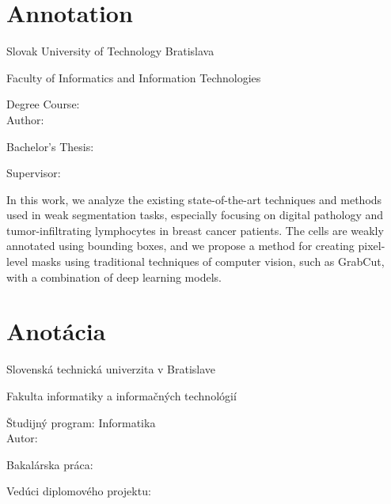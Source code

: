 
\thispagestyle{empty}

\section*{Annotation}

\begin{minipage}[t]{1\columnwidth}%
Slovak University of Technology Bratislava 

Faculty of Informatics and Information Technologies

Degree Course: \myStudyProgram\\

Author: \myName

Bachelor's Thesis: \myTitle

Supervisor: \mySupervisor

\myDate%
\end{minipage}

\bigskip{}

In this work, we analyze the existing state-of-the-art techniques and methods used in weak segmentation tasks, especially focusing on digital pathology and tumor-infiltrating lymphocytes in breast cancer patients. The cells are weakly annotated using bounding boxes, and we propose a method for creating pixel-level masks using traditional techniques of computer vision, such as GrabCut, with a combination of deep learning models.



\newpage{}\thispagestyle{empty}

\newpage
\thispagestyle{empty}
\mbox{}
\newpage

\thispagestyle{empty}
\section*{Anotácia}

\begin{minipage}[t]{1\columnwidth}%
Slovenská technická univerzita v Bratislave

Fakulta informatiky a informačných technológií

Študijný program: Informatika\\

Autor: \myName

Bakalárska práca: \myTitle

Vedúci diplomového projektu: \mySupervisor

\myDateSK%
\end{minipage}

